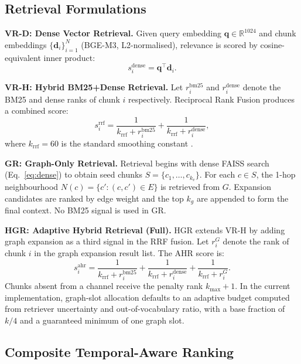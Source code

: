 \documentclass[conference,10pt,twocolumn]{IEEEtran}
\begin{document}
\subsection{Retrieval Formulations}

\textbf{VR-D: Dense Vector Retrieval.} Given query embedding $\mathbf{q} \in \mathbb{R}^{1024}$ and chunk embeddings $\{\mathbf{d}_i\}_{i=1}^N$ (BGE-M3, L2-normalised), relevance is scored by cosine-equivalent inner product:
\begin{equation}
  s^{\mathrm{dense}}_i = \mathbf{q}^\top\mathbf{d}_i.
  \label{eq:dense}
\end{equation}

\textbf{VR-H: Hybrid BM25+Dense Retrieval.} Let $r^{\mathrm{bm25}}_i$ and $r^{\mathrm{dense}}_i$ denote the BM25 and dense ranks of chunk $i$ respectively. Reciprocal Rank Fusion produces a combined score:
\begin{equation}
  s^{\mathrm{rrf}}_i = \frac{1}{k_{\mathrm{rrf}}+r^{\mathrm{bm25}}_i} + \frac{1}{k_{\mathrm{rrf}}+r^{\mathrm{dense}}_i},
  \label{eq:rrf}
\end{equation}
where $k_{\mathrm{rrf}}=60$ is the standard smoothing constant \cite{cormack2009rrf}.

\textbf{GR: Graph-Only Retrieval.} Retrieval begins with dense FAISS search (Eq.~\ref{eq:dense}) to obtain seed chunks $S=\{c_1,\ldots,c_{k_v}\}$. For each $c \in S$, the 1-hop neighbourhood $N(c)=\{c':(c,c')\in E\}$ is retrieved from $G$. Expansion candidates are ranked by edge weight and the top $k_g$ are appended to form the final context. No BM25 signal is used in GR.

\textbf{HGR: Adaptive Hybrid Retrieval (Full).} HGR extends VR-H by adding graph expansion as a third signal in the RRF fusion. Let $r^G_i$ denote the rank of chunk $i$ in the graph expansion result list. The AHR score is:
\begin{equation}
  s^{\mathrm{ahr}}_i = \frac{1}{k_{\mathrm{rrf}}+r^{\mathrm{bm25}}_i} + \frac{1}{k_{\mathrm{rrf}}+r^{\mathrm{dense}}_i} + \frac{1}{k_{\mathrm{rrf}}+r^G_i}.
  \label{eq:ahr}
\end{equation}
Chunks absent from a channel receive the penalty rank $k_{\max}+1$. In the current implementation, graph-slot allocation defaults to an adaptive budget computed from retriever uncertainty and out-of-vocabulary ratio, with a base fraction of $k/4$ and a guaranteed minimum of one graph slot.

\subsection{Composite Temporal-Aware Ranking}
\end{document}
